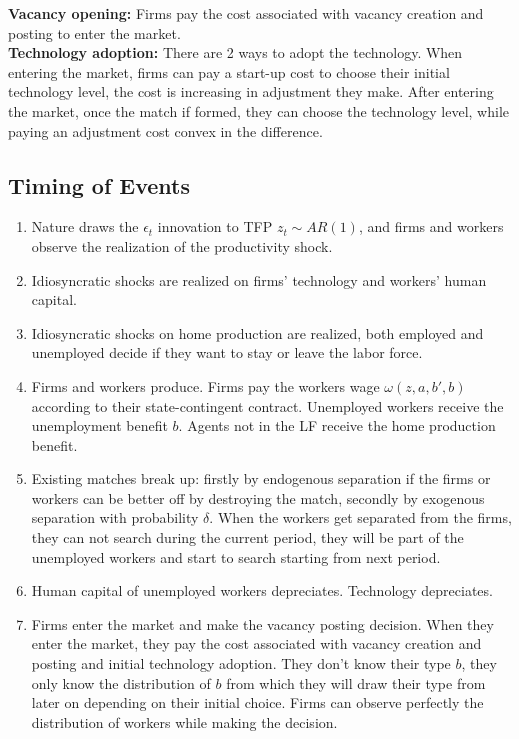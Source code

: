 \documentclass{article}
\newcommand{\1}{\mathbb{1}}
\begin{document}
\textbf{Vacancy opening: }
Firms pay the cost associated with vacancy creation and posting to enter the market.  \\

\textbf{Technology adoption: }
There are 2 ways to adopt the technology. When entering the market, firms can pay a start-up cost to choose their initial technology level, the cost is increasing in adjustment they make. After entering the market, once the match if formed, they can choose the technology level, while paying an adjustment cost convex in the difference. 

\subsection{Timing of Events}
\begin{enumerate}
\item Nature draws the $\epsilon_t$ innovation to TFP $z_t \sim AR(1)$, and firms and workers observe the realization of the productivity shock. 
\item Idiosyncratic shocks are realized on firms' technology and workers' human capital. 
\item Idiosyncratic shocks on home production are realized, both employed and unemployed decide if they want to stay or leave the labor force. 
\item Firms and workers produce. Firms pay the workers wage $\omega(z,a,b',b)$ according to their state-contingent contract. Unemployed workers receive the unemployment benefit $b$. Agents not in the LF receive the home production benefit. 
\item Existing matches break up: firstly by endogenous separation if the firms or workers can be better off by destroying the match, secondly by exogenous separation with probability $\delta$. When the workers get separated from the firms, they can not search during the current period, they will be part of the unemployed workers and start to search starting from next period. 
\item Human capital of unemployed workers depreciates. Technology depreciates.
\item Firms enter the market and make the vacancy posting decision. When they enter the market, they pay the cost associated with vacancy creation and posting and initial technology adoption. They don't know their type $b$, they only know the distribution of $b$ from which they will draw their type from later on depending on their initial choice. Firms can observe perfectly the distribution of workers while making the decision. 

\end{enumerate}
\end{document}
